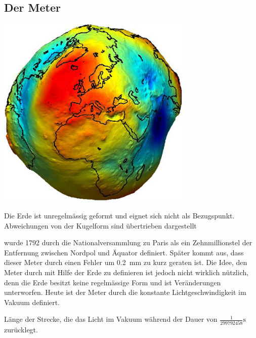 \subsection{Der Meter} 
\begin{marginfigure}
    \includegraphics[width=0.7\textwidth]{Bilder/geoid.jpg}
    \label{fig:geoidfig}
    \caption{Die Erde ist unregelmässig geformt und eignet sich nicht als Bezugspunkt. Abweichungen von der Kugelform sind übertrieben dargestellt}
\end{marginfigure}
wurde 1792 durch die Nationalversammlung zu Paris als ein Zehnmillionstel der Entfernung zwischen Nordpol und Äquator definiert. Später kommt aus, dass dieser Meter durch einen Fehler um \SI{0.2}{\milli \metre} zu kurz geraten ist. Die Idee, den Meter durch mit Hilfe der Erde zu definieren ist jedoch nicht wirklich nützlich, denn die Erde besitzt keine regelmässige Form und ist Veränderungen unterworfen. Heute ist der Meter durch die konstante Lichtgeschwindigkeit im Vakuum definiert.
\begin{definition}
Länge der Strecke, die das Licht im Vakuum während der Dauer von $\frac{1}{299792458}\si{\second}$ zurücklegt.
\end{definition}

